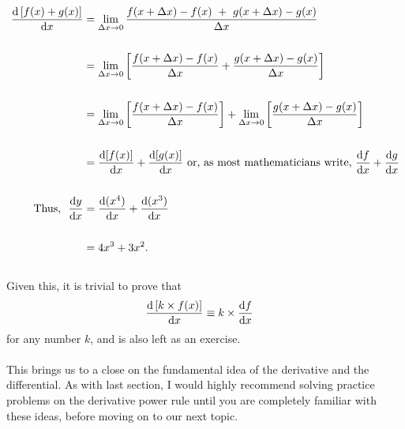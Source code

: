 \documentclass[11pt]{article}
\numberwithin{equation}{section}
\begin{document}
\begin{align*}
	\frac{\textrm{d}\left[ f(x) + g(x) \right]}{\textrm{d}x} &= \lim_{\Delta x \to 0} \frac{f(x + \Delta x) - f(x) \ + \  g(x + \Delta x) - g(x)}{\Delta x} \\ \\
	&= \lim_{\Delta x \to 0} \left[ \frac{f(x + \Delta x) - f(x)}{\Delta x} + \frac{g(x + \Delta x) - g(x)}{\Delta x} \right] \\ \\
	&= \lim_{\Delta x \to 0} \left[ \frac{f(x + \Delta x) - f(x)}{\Delta x} \right] + \lim_{\Delta x \to 0} \left[ \frac{g(x + \Delta x) - g(x)}{\Delta x} \right] \\ \\
	&= \frac{\textrm{d}[f(x)]}{\textrm{d}x} + \frac{\textrm{d}[g(x)]}{\textrm{d}x} \ \textrm{or, as most mathematicians write, } \frac{\textrm{d}f}{\textrm{d}x} + \frac{\textrm{d}g}{\textrm{d}x} \\ \\
	\textrm{Thus, } \ \frac{\textrm{d}y}{\textrm{d}x} &= \frac{\textrm{d}(x^4)}{\textrm{d}x} + \frac{\textrm{d}(x^3)}{\textrm{d}x} \\ \\ &= 4x^3 + 3x^2.
\end{align*}
\\ Given this, it is trivial to prove that 
\begin{align*}
	\frac{\textrm{d}\, [k \times f(x)]}{\textrm{d}x} & \equiv k \times \frac{\textrm{d}f}{\textrm{d}x}
\end{align*}
for any number \(k\), and is also left as an exercise.
\\ \\ This brings us to a close on the fundamental idea of the derivative and the differential. As with last section, I would highly recommend solving practice problems on the derivative power rule until you are completely familiar with these ideas, before moving on to our next topic.
\end{document}
